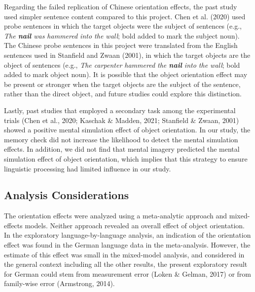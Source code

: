 \documentclass[
  man,mask,floatsintext]{apa7}
\begin{document}
Regarding the failed replication of Chinese orientation effects, the
past study used simpler sentence content compared to this project.
Chen et al. (2020) used probe sentences in which the target objects
were the subject of sentences (e.g., \emph{The \textbf{nail} was hammered into the
wall}; bold added to mark the subject noun). The Chinese probe sentences
in this project were translated from the English sentences used in
Stanfield and Zwaan (2001), in which the target objects are the object of
sentences (e.g., \emph{The carpenter hammered the \textbf{nail} into the wall};
bold added to mark object noun). It is possible that the object
orientation effect may be present or stronger when the target objects
are the subject of the sentence, rather than the direct object, and
future studies could explore this distinction.

Lastly, past studies that employed a secondary task among the
experimental trials (Chen et al., 2020; Kaschak \& Madden, 2021; Stanfield \& Zwaan, 2001) showed a
positive mental simulation effect of object orientation. In our study,
the memory check did not increase the likelihood to detect the mental
simulation effects. In addition, we did not find that mental imagery
predicted the mental simulation effect of object orientation, which
implies that this strategy to ensure linguistic processing had limited
influence in our study.

\hypertarget{analysis-considerations}{%
\subsection{Analysis Considerations}\label{analysis-considerations}}

The orientation effects were analyzed using a meta-analytic approach and
mixed-effects models. Neither approach revealed an overall effect of
object orientation. In the exploratory language-by-language analysis, an
indication of the orientation effect was found in the German language
data in the meta-analysis. However, the estimate of this effect was
small in the mixed-model analysis, and considered in the general context
including all the other results, the present exploratory result for
German could stem from measurement error
(Loken \& Gelman, 2017) or from family-wise error
(Armstrong, 2014).
\end{document}
